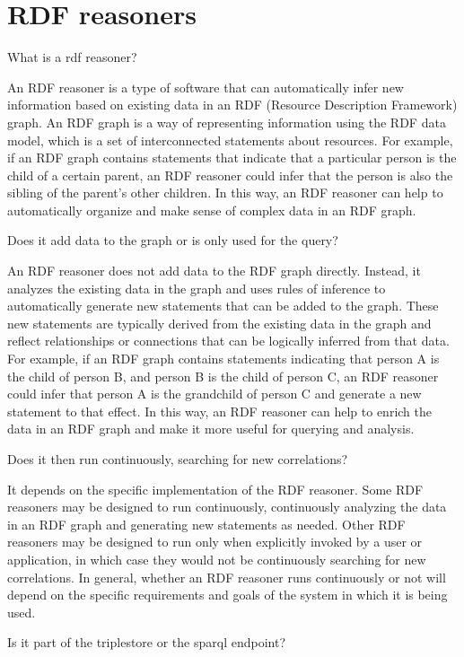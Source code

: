 \section*{RDF reasoners}
\begin{description}
	\me What is a rdf reasoner?
	
	\gpt An RDF reasoner is a type of software that can automatically infer new information based on existing data in an RDF (Resource Description Framework) graph. An RDF graph is a way of representing information using the RDF data model, which is a set of interconnected statements about resources. For example, if an RDF graph contains statements that indicate that a particular person is the child of a certain parent, an RDF reasoner could infer that the person is also the sibling of the parent's other children. In this way, an RDF reasoner can help to automatically organize and make sense of complex data in an RDF graph.
	
	\me Does it add data to the graph or is only used for the query?
	
	\gpt An RDF reasoner does not add data to the RDF graph directly. Instead, it analyzes the existing data in the graph and uses rules of inference to automatically generate new statements that can be added to the graph. These new statements are typically derived from the existing data in the graph and reflect relationships or connections that can be logically inferred from that data. For example, if an RDF graph contains statements indicating that person A is the child of person B, and person B is the child of person C, an RDF reasoner could infer that person A is the grandchild of person C and generate a new statement to that effect. In this way, an RDF reasoner can help to enrich the data in an RDF graph and make it more useful for querying and analysis.
	
	\me Does it then run continuously, searching for new correlations?
	
	\gpt It depends on the specific implementation of the RDF reasoner. Some RDF reasoners may be designed to run continuously, continuously analyzing the data in an RDF graph and generating new statements as needed. Other RDF reasoners may be designed to run only when explicitly invoked by a user or application, in which case they would not be continuously searching for new correlations. In general, whether an RDF reasoner runs continuously or not will depend on the specific requirements and goals of the system in which it is being used.
	
	\me Is it part of the triplestore or the sparql endpoint?
	

\end{description}
